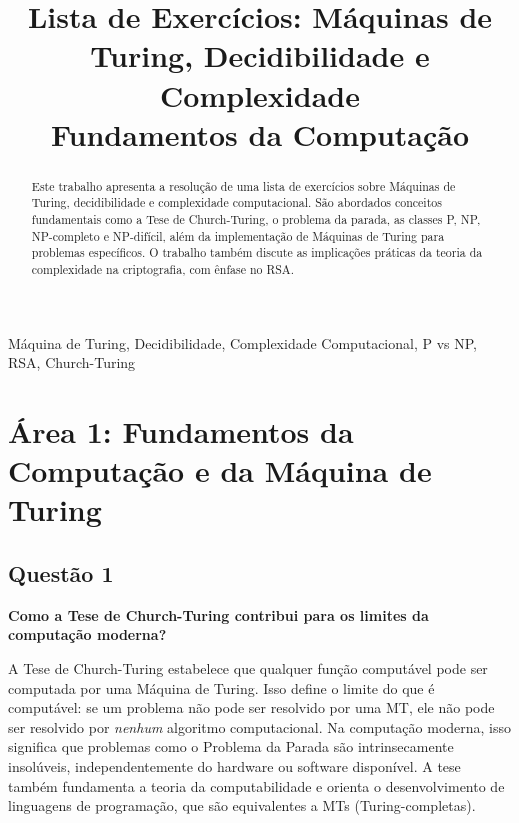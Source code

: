 \documentclass[conference]{IEEEtran}
\begin{document}
\title{Lista de Exercícios: Máquinas de Turing, Decidibilidade e Complexidade\\
{\footnotesize Fundamentos da Computação}
}

\author{
\and
{}
}

\maketitle

\begin{abstract}
Este trabalho apresenta a resolução de uma lista de exercícios sobre Máquinas de Turing, decidibilidade e complexidade computacional. São abordados conceitos fundamentais como a Tese de Church-Turing, o problema da parada, as classes P, NP, NP-completo e NP-difícil, além da implementação de Máquinas de Turing para problemas específicos. O trabalho também discute as implicações práticas da teoria da complexidade na criptografia, com ênfase no RSA.
\end{abstract}

\begin{IEEEkeywords}
Máquina de Turing, Decidibilidade, Complexidade Computacional, P vs NP, RSA, Church-Turing
\end{IEEEkeywords}

\section{Área 1: Fundamentos da Computação e da Máquina de Turing}

\subsection{Questão 1}
\textbf{Como a Tese de Church-Turing contribui para os limites da computação moderna?}

A Tese de Church-Turing estabelece que qualquer função computável pode ser computada por uma Máquina de Turing. Isso define o limite do que é computável: se um problema não pode ser resolvido por uma MT, ele não pode ser resolvido por \textit{nenhum} algoritmo computacional. Na computação moderna, isso significa que problemas como o Problema da Parada são intrinsecamente insolúveis, independentemente do hardware ou software disponível. A tese também fundamenta a teoria da computabilidade e orienta o desenvolvimento de linguagens de programação, que são equivalentes a MTs (Turing-completas).
\end{document}
